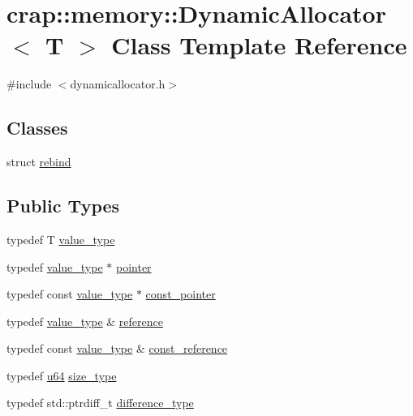 \hypertarget{classcrap_1_1memory_1_1_dynamic_allocator}{\section{crap\-:\-:memory\-:\-:Dynamic\-Allocator$<$ T $>$ Class Template Reference}
\label{classcrap_1_1memory_1_1_dynamic_allocator}
}


{\ttfamily \#include $<$dynamicallocator.\-h$>$}

\subsection*{Classes}
\begin{DoxyCompactItemize}
\item 
struct \hyperlink{structcrap_1_1memory_1_1_dynamic_allocator_1_1rebind}{rebind}
\end{DoxyCompactItemize}
\subsection*{Public Types}
\begin{DoxyCompactItemize}
\item 
typedef T \hyperlink{classcrap_1_1memory_1_1_dynamic_allocator_a6a2ec3aa4d76e563cad6948ce2b563d3}{value\-\_\-type}
\item 
typedef \hyperlink{classcrap_1_1memory_1_1_dynamic_allocator_a6a2ec3aa4d76e563cad6948ce2b563d3}{value\-\_\-type} $\ast$ \hyperlink{classcrap_1_1memory_1_1_dynamic_allocator_a281b8cb1ad7cd494edf5f6b67daea60a}{pointer}
\item 
typedef const \hyperlink{classcrap_1_1memory_1_1_dynamic_allocator_a6a2ec3aa4d76e563cad6948ce2b563d3}{value\-\_\-type} $\ast$ \hyperlink{classcrap_1_1memory_1_1_dynamic_allocator_a31367ceafaf5d2a05c3a04e975e53775}{const\-\_\-pointer}
\item 
typedef \hyperlink{classcrap_1_1memory_1_1_dynamic_allocator_a6a2ec3aa4d76e563cad6948ce2b563d3}{value\-\_\-type} \& \hyperlink{classcrap_1_1memory_1_1_dynamic_allocator_ad17b30d2ee05bca34e1a3ea8d212db16}{reference}
\item 
typedef const \hyperlink{classcrap_1_1memory_1_1_dynamic_allocator_a6a2ec3aa4d76e563cad6948ce2b563d3}{value\-\_\-type} \& \hyperlink{classcrap_1_1memory_1_1_dynamic_allocator_aa4033bbb72cceae0d908aec9a9539f81}{const\-\_\-reference}
\item 
typedef \hyperlink{types_8h_a3f7e2bcbb0b4c338f3c4f6c937cd4234}{u64} \hyperlink{classcrap_1_1memory_1_1_dynamic_allocator_a48b438ee17d8e7a384bde751f72ef17b}{size\-\_\-type}
\item 
typedef std\-::ptrdiff\-\_\-t \hyperlink{classcrap_1_1memory_1_1_dynamic_allocator_a0cc60d8108a3a59ecef542f79f5ca53a}{difference\-\_\-type}
\end{DoxyCompactItemize}
